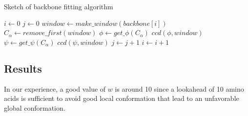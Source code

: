 \begin{algorithm}
\caption{Sketch of backbone fitting algorithm}
\label{alg:ccd}
\begin{algorithmic}
	\STATE $i \gets 0$
		\STATE $j \gets 0$
			\STATE $window \gets make\_window(backbone[i])$
				\STATE $C_\alpha \gets remove\_first(window)$
				\STATE $\phi \gets get\_\phi(C_\alpha)$
				\STATE $ccd(\phi,window)$
				\STATE $\psi \gets get\_\psi(C_\alpha)$
				\STATE $ccd(\psi,window)$
			\ENDWHILE
			\STATE $j \gets j+1$
		\ENDWHILE
		\STATE $i \gets i+1$
	\ENDWHILE
\end{algorithmic}
\end{algorithm}


\subsection{Results}

In our experience, a good value of $w$ is around 10 since a lookahead of 10 amino acids is sufficient to avoid good local conformation that lead to an unfavorable global conformation.







